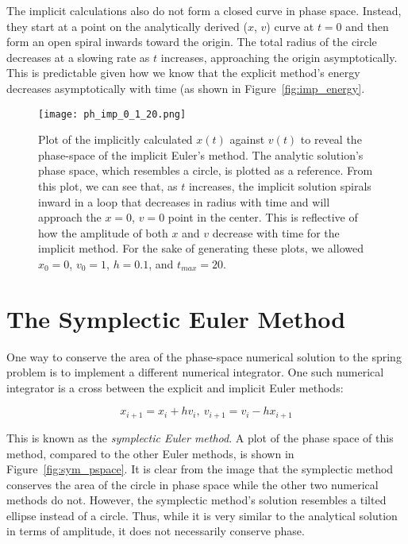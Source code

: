 \documentclass{article}
\begin{document}
The implicit calculations also do not form a closed curve in phase space.  Instead, they start at a point on the analytically derived ($x$, $v$) curve at $t = 0$ and then form an open spiral inwards toward the origin. The total radius of the circle decreases at a slowing rate as $t$ increases, approaching the origin asymptotically.  This is predictable given how we know that the explicit method's energy decreases asymptotically with time (as shown in Figure~\ref{fig:imp_energy}.

\begin{figure}
    \centering
    \texttt{[image: ph\_imp\_0\_1\_20.png]}{}
    \caption{Plot of the implicitly calculated $x(t)$ against $v(t)$ to reveal the phase-space of the implicit Euler's method.  The analytic solution's phase space, which resembles a circle, is plotted as a reference.  From this plot, we can see that, as $t$ increases, the implicit solution spirals inward in a loop that decreases in radius with time and will approach the $x = 0$, $v = 0$ point in the center.  This is reflective of how the amplitude of both $x$ and $v$ decrease with time for the implicit method.  For the sake of generating these plots, we allowed $x_0 = 0$, $v_0 = 1$, $h = 0.1$, and $t_{max} = 20$.}
    \label{fig:imp_pspace}
\end{figure}

\section{The Symplectic Euler Method}

One way to conserve the area of the phase-space numerical solution to the spring problem is to implement a different numerical integrator.  One such numerical integrator is a cross between the explicit and implicit Euler methods:

\begin{equation}
    x_{i + 1} = x_i + hv_i, ~v_{i + 1} = v_i - hx_{i + 1}
\end{equation}

This is known as the \textit{symplectic Euler method}.  A plot of the phase space of this method, compared to the other Euler methods, is shown in Figure~\ref{fig:sym_pspace}.  It is clear from the image that the symplectic method conserves the area of the circle in phase space while the other two numerical methods do not.  However, the symplectic method's solution resembles a tilted ellipse instead of a circle.  Thus, while it is very similar to the analytical solution in terms of amplitude, it does not necessarily conserve phase.  
\end{document}
